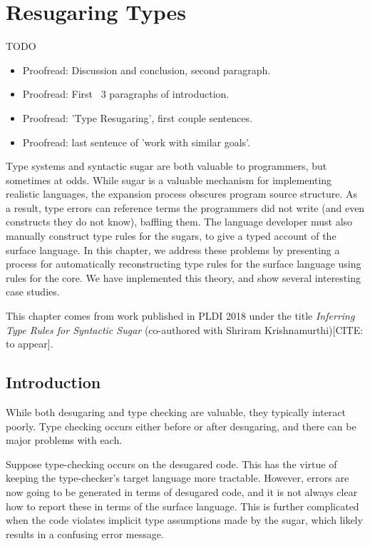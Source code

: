\chapter{Resugaring Types}\label{chap:resugar-types}

TODO
\begin{itemize}
\item Proofread: Discussion and conclusion, second paragraph.
\item Proofread: First ~3 paragraphs of introduction.
\item Proofread: 'Type Resugaring', first couple sentences.
\item Proofread: last sentence of 'work with similar goals'.
\end{itemize}

\newcommand{\reflem}[1]{lemma \ref{lemma:rtype-#1} (#1)}
\newcommand{\Reflem}[1]{Lemma \ref{lemma:rtype-#1} (#1)}
\newcommand{\refass}[1]{assumption \ref{assumption:rtype-#1} (#1)}
\newcommand{\Refass}[1]{Assumption \ref{assumption:rtype-#1} (#1)}


Type systems and syntactic sugar are both valuable to programmers, but
sometimes at odds. While sugar is a valuable mechanism for
implementing realistic languages, the expansion process obscures
program source structure. As a result, type errors can reference terms
the programmers did not write (and even constructs they do not know),
baffling them. The language developer must also manually construct
type rules for the sugars, to give a typed account of the surface
language. In this chapter, we address these problems by presenting a
process for automatically reconstructing type rules for the surface
language using rules for the core. We have implemented this theory,
and show several interesting case studies.

This chapter comes from work published in PLDI 2018 under the title
\emph{Inferring Type Rules for Syntactic Sugar} (co-authored with
Shriram Krishnamurthi)[CITE: to appear].

\section{Introduction}

While both desugaring and type checking are valuable, they typically
interact poorly. Type checking occurs either before or after
desugaring, and there can be major problems with each.

Suppose type-checking occurs on the desugared code. This has the
virtue of keeping the type-checker's target language more
tractable. However, errors are now going to be generated in terms of
desugared code, and it is not always clear how to report these in
terms of the surface language. This is further complicated when the
code violates implicit type assumptions made by the sugar, which
likely results in a confusing error message.

